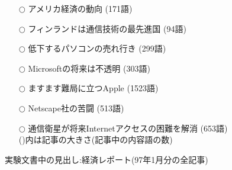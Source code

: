 \begin{figure}[htbp]
\begin{center}
  \begin{minipage}{12cm}\small
    \begin{itemize}
      \item[$\bigcirc$]アメリカ経済の動向 (171語)
      \item[$\bigcirc$]フィンランドは通信技術の最先進国 (94語)
      \item[$\bigcirc$]低下するパソコンの売れ行き (299語)
      \item[$\bigcirc$]Microsoftの将来は不透明 (303語)
      \item[$\bigcirc$]ますます難局に立つApple (1523語)
      \item[$\bigcirc$]Netscape社の苦闘 (513語)
      \item[$\bigcirc$]通信衛星が将来Internetアクセスの困難を解消 (653語)\\
        ()内は記事の大きさ(記事中の内容語の数)
     \end{itemize}
    \caption{実験文書中の見出し:経済レポート(97年1月分の全記事)}
    \label{fig:室賀教授レポートの見出し}
    \end{minipage}
  \end{center}
\end{figure}




\begin{biography}

\end{biography}



